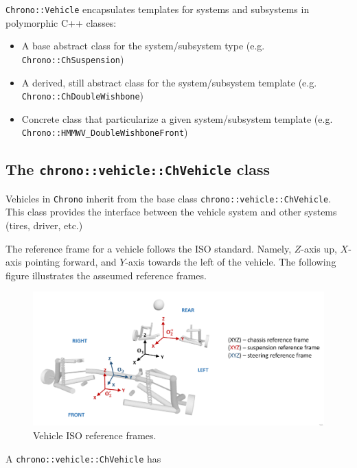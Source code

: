 \lstinline{Chrono::Vehicle} encapsulates templates for systems and subsystems in polymorphic C++ classes:

\begin{itemize}
\item A base abstract class for the system/subsystem type (e.g. \lstinline{Chrono::ChSuspension})
\item A derived, still abstract class for the system/subsystem template (e.g.  \lstinline{Chrono::ChDoubleWishbone})
\item Concrete class that particularize a given system/subsystem template (e.g. \lstinline{Chrono::HMMWV_DoubleWishboneFront})
\end{itemize}

\subsection{The \lstinline{chrono::vehicle::ChVehicle} class}

Vehicles in \lstinline{Chrono} inherit from the base class \lstinline{chrono::vehicle::ChVehicle}. 
This class provides the interface between the vehicle system and other systems (tires, driver, etc.)

The reference frame for a vehicle follows the ISO standard. 
Namely, $Z$-axis up, $X$-axis pointing forward, and $Y$-axis towards the left of the vehicle. The following figure illustrates
the asseumed reference frames.


\begin{figure}[!htb]
\begin{center}
\includegraphics[scale=0.290]{img/vehicle_iso_ref_frame.jpeg}
\end{center}
\caption{Vehicle ISO reference frames.}
\label{vehicle_iso_ref_frame}
\end{figure}

A \lstinline{chrono::vehicle::ChVehicle} has

